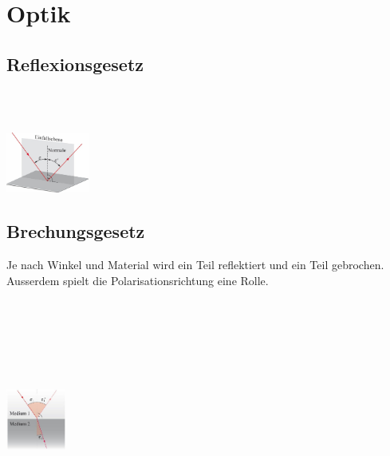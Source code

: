\section{Optik}
\subsection{Reflexionsgesetz}

\begin{center}
	\begin{minipage}{0.3\textwidth}
		 \\
	
		 \\
	\end{minipage}%
	\begin{minipage}{0.3\textwidth}
		\includegraphics[height=2cm,keepaspectratio=true]{Images/reflexionsgesetz.png}
	\end{minipage}
\end{center}




\subsection{Brechungsgesetz}

Je nach Winkel und Material wird ein Teil reflektiert und ein Teil gebrochen. Ausserdem spielt die Polarisationsrichtung eine Rolle.
\begin{center}
	\begin{minipage}{0.3\textwidth}
		\\
	
		 \\
		 \\
		 \\
		 \\
	\end{minipage}%
	\begin{minipage}{0.3\textwidth}
		\includegraphics[height=2cm,keepaspectratio=true]{Images/brechungsgesetz.png}
	\end{minipage}
\end{center}




